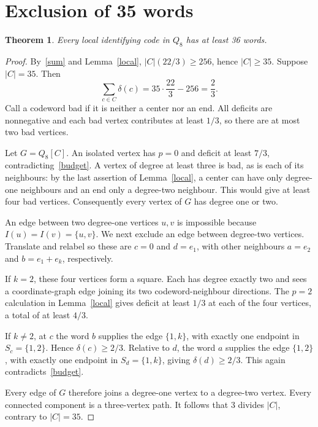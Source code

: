 \documentclass[11pt]{article}
\newtheorem{theorem}{Theorem}
\begin{document}
\section{Exclusion of 35 words}
\begin{theorem}\label{lb}
Every local identifying code in $Q_8$ has at least 36 words.
\end{theorem}
\begin{proof}
By~\eqref{sum} and Lemma~\ref{local}, $|C|(22/3)\ge256$, hence $|C|\ge35$. Suppose $|C|=35$. Then
\begin{equation}\label{budget}
 \sum_{c\in C}\delta(c)=35\cdot\frac{22}3-256=\frac23.
\end{equation}
Call a codeword bad if it is neither a center nor an end. All deficits are nonnegative and each bad vertex contributes at least $1/3$, so there are at most two bad vertices.

Let $G=Q_8[C]$. An isolated vertex has $p=0$ and deficit at least $7/3$, contradicting~\eqref{budget}. A vertex of degree at least three is bad, as is each of its neighbours: by the last assertion of Lemma~\ref{local}, a center can have only degree-one neighbours and an end only a degree-two neighbour. This would give at least four bad vertices. Consequently every vertex of $G$ has degree one or two.

An edge between two degree-one vertices $u,v$ is impossible because $I(u)=I(v)=\{u,v\}$. We next exclude an edge between degree-two vertices. Translate and relabel so these are $c=0$ and $d=e_1$, with other neighbours $a=e_2$ and $b=e_1+e_k$, respectively.

If $k=2$, these four vertices form a square. Each has degree exactly two and sees a coordinate-graph edge joining its two codeword-neighbour directions. The $p=2$ calculation in Lemma~\ref{local} gives deficit at least $1/3$ at each of the four vertices, a total of at least $4/3$.

If $k\ne2$, at $c$ the word $b$ supplies the edge $\{1,k\}$, with exactly one endpoint in $S_c=\{1,2\}$. Hence $\delta(c)\ge2/3$. Relative to $d$, the word $a$ supplies the edge $\{1,2\}$, with exactly one endpoint in $S_d=\{1,k\}$, giving $\delta(d)\ge2/3$. This again contradicts~\eqref{budget}.

Every edge of $G$ therefore joins a degree-one vertex to a degree-two vertex. Every connected component is a three-vertex path. It follows that $3$ divides $|C|$, contrary to $|C|=35$.
\end{proof}
\end{document}
